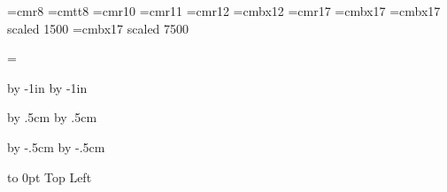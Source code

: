 






\vsize=210mm
\hsize=297mm






\nopagenumbers


\parindent=0pt

\font\small=cmr8
\font\smalltt=cmtt8
\font\medium=cmr10
\font\largemed=cmr11
\font\large=cmr12
\font\largebx=cmbx12
\font\Large=cmr17
\font\Largebx=cmbx17
\font\hugebx=cmbx17 scaled 1500
\font\Hugebx=cmbx17 scaled 7500

\let\numbercolor=\White







\headline={}

\advance\voffset by -1in
\advance\hoffset by -1in

\advance\voffset by .5cm
\advance\hoffset by .5cm

\advance\hsize by -.5cm
\advance\vsize by -.5cm


\nopagenumbers


\def\epsfsize#1#2{1.625#1}
\nopagenumbers

\baselineskip=0pt
\parskip=0pt

\vbox to 0pt{\vskip-8cm
\vss}
{\hugebx Top Left}
  


\bye




